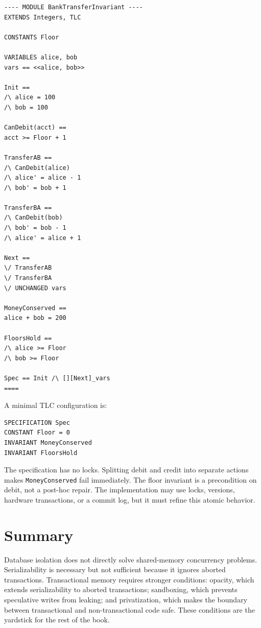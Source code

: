 \begin{lstlisting}[caption={A TLA+ model of atomic bank transfers; run TLC
with \texttt{Floor=0}.},
label={lst:bank-transfer-invariant}]
---- MODULE BankTransferInvariant ----
EXTENDS Integers, TLC

CONSTANTS Floor

VARIABLES alice, bob
vars == <<alice, bob>>

Init ==
/\ alice = 100
/\ bob = 100

CanDebit(acct) ==
acct >= Floor + 1

TransferAB ==
/\ CanDebit(alice)
/\ alice' = alice - 1
/\ bob' = bob + 1

TransferBA ==
/\ CanDebit(bob)
/\ bob' = bob - 1
/\ alice' = alice + 1

Next ==
\/ TransferAB
\/ TransferBA
\/ UNCHANGED vars

MoneyConserved ==
alice + bob = 200

FloorsHold ==
/\ alice >= Floor
/\ bob >= Floor

Spec == Init /\ [][Next]_vars
====
\end{lstlisting}

A minimal TLC configuration is:

\begin{lstlisting}[caption={TLC configuration for the bank-transfer
invariant.},
label={lst:bank-transfer-cfg}]
SPECIFICATION Spec
CONSTANT Floor = 0
INVARIANT MoneyConserved
INVARIANT FloorsHold
\end{lstlisting}

The specification has no locks. Splitting debit and credit into separate
actions makes \texttt{MoneyConserved} fail immediately. The floor invariant is
a precondition on debit, not a post-hoc repair. The implementation may use
locks, versions, hardware transactions, or a commit log, but it must refine
this atomic behavior.

\section{Summary}

Database isolation does not directly solve shared-memory concurrency problems.
Serializability is necessary but not sufficient because it ignores aborted
transactions. Transactional memory requires stronger conditions: opacity,
which extends serializability to aborted transactions; sandboxing, which
prevents speculative writes from leaking; and privatization, which makes the
boundary between transactional and non-transactional code safe. These
conditions are the yardstick for the rest of the book.

